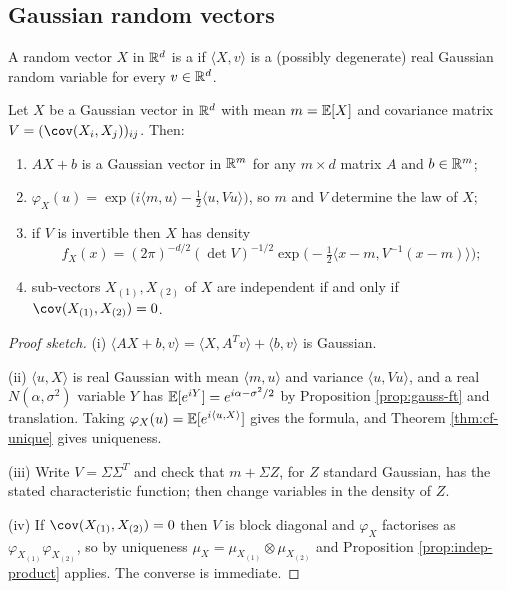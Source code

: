 \documentclass[a4paper]{scrartcl}
\newcommand{\ip}[2]{\langle #1, #2 \rangle}
\begin{document}
\subsection{Gaussian random vectors}

\begin{definition}
	A random vector $X$ in $\mathbb{R}^d$ is a  if $\ip{X}{v}$ is a (possibly degenerate) real Gaussian random variable for every $v \in \mathbb{R}^d$.
\end{definition}

\begin{proposition}\label{prop:gaussian-vec}
	Let $X$ be a Gaussian vector in $\mathbb{R}^d$ with mean $m = \mathbb{E}[X]$ and covariance matrix $V = (\cov(X_i,X_j))_{ij}$. Then:
	\begin{enumerate}[label=(\roman*)]
		\item $AX+b$ is a Gaussian vector in $\mathbb{R}^m$ for any $m\times d$ matrix $A$ and $b\in\mathbb{R}^m$;
		\item $\varphi_X(u)=\exp\big(i\ip{m}{u}-\tfrac12\ip{u}{Vu}\big)$, so $m$ and $V$ determine the law of $X$;
		\item if $V$ is invertible then $X$ has density
		$$
		f_X(x) = (2\pi)^{-d/2}(\det V)^{-1/2}\exp\Big(-\tfrac12\ip{x-m}{V^{-1}(x-m)}\Big);
		$$
		\item sub-vectors $X_{(1)}, X_{(2)}$ of $X$ are independent if and only if $\cov(X_{(1)},X_{(2)})=0$.
	\end{enumerate}
\end{proposition}
\begin{proof}[Proof sketch]
	(i) $\ip{AX+b}{v}=\ip{X}{A^Tv}+\ip{b}{v}$ is Gaussian.

	(ii) $\ip{u}{X}$ is real Gaussian with mean $\ip{m}{u}$ and variance $\ip{u}{Vu}$, and a real $N(\alpha,\sigma^2)$ variable $Y$ has $\mathbb{E}[e^{iY}]=e^{i\alpha - \sigma^2/2}$ by Proposition \ref{prop:gauss-ft} and translation. Taking $\varphi_X(u)=\EE[e^{i\ip{u}{X}}]$ gives the formula, and Theorem \ref{thm:cf-unique} gives uniqueness.

	(iii) Write $V = \Sigma\Sigma^T$ and check that $m + \Sigma Z$, for $Z$ standard Gaussian, has the stated characteristic function; then change variables in the density of $Z$.

	(iv) If $\cov(X_{(1)},X_{(2)})=0$ then $V$ is block diagonal and $\varphi_X$ factorises as $\varphi_{X_{(1)}}\varphi_{X_{(2)}}$, so by uniqueness $\mu_X = \mu_{X_{(1)}}\otimes\mu_{X_{(2)}}$ and Proposition \ref{prop:indep-product} applies. The converse is immediate.
\end{proof}
\end{document}
